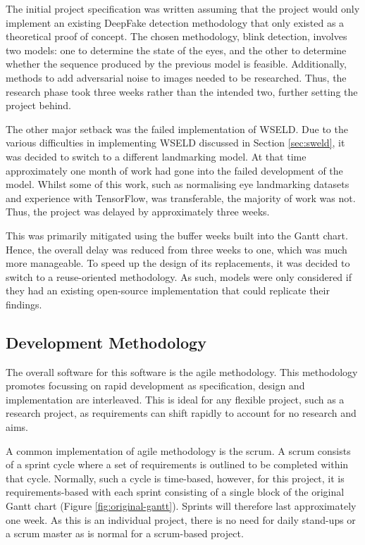 The initial project specification was written assuming that the project would only implement an existing DeepFake detection methodology that only existed as a theoretical proof of concept. The chosen methodology, blink detection, involves two models: one to determine the state of the eyes, and the other to determine whether the sequence produced by the previous model is feasible. Additionally, methods to add adversarial noise to images needed to be researched. Thus, the research phase took three weeks rather than the intended two, further setting the project behind.

The other major setback was the failed implementation of WSELD. Due to the various difficulties in implementing WSELD discussed in Section \ref{sec:sweld}, it was decided to switch to a different landmarking model. At that time approximately one month of work had gone into the failed development of the model. Whilst some of this work, such as normalising eye landmarking datasets and experience with TensorFlow, was transferable, the majority of work was not. Thus, the project was delayed by approximately three weeks. 

This was primarily mitigated using the buffer weeks built into the Gantt chart. Hence, the overall delay was reduced from three weeks to one, which was much more manageable. To speed up the design of its replacements, it was decided to switch to a reuse-oriented methodology. As such, models were only considered if they had an existing open-source implementation that could replicate their findings.

\subsection{Development Methodology}

The overall software for this software is the agile methodology\cite{beck2001manifesto}. This methodology promotes focussing on rapid development as specification, design and implementation are
interleaved\cite{archbold2023software}. This is ideal for any flexible project, such as a research project, as requirements can shift rapidly to account for no research and aims. 

A common implementation of agile methodology is the scrum. A scrum consists of a sprint cycle where a set of requirements is outlined to be completed within that cycle. Normally, such a cycle is time-based, however, for this project, it is requirements-based with each sprint consisting of a single block of the original Gantt chart (Figure \ref{fig:original-gantt}). Sprints will therefore last approximately one week. As this is an individual project, there is no need for daily stand-ups or a scrum master as is normal for a scrum-based project.


